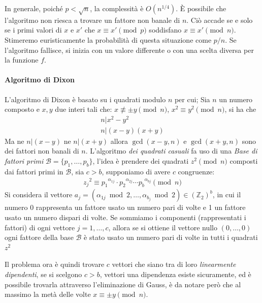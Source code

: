 \vspace{0.2cm} \noindent In generale, poiché $p<\sqrt{n}$, la complessità è $O(n^{1/4})$. È possibile che l'algoritmo non riesca a trovare un fattore non banale di $n$. Ciò accade se e solo se i primi valori di $x$ e $x'$ che $x \equiv x' \pmod p$ soddisfano $x \equiv x'  \pmod n$. Stimeremo euristicamente la probabilità di questa situazione come $p/n$. Se l'algoritmo fallisce, si inizia con un valore differente o con una scelta diversa per la funzione $f$. 


\vspace{0.2cm} \noindent \paragraph{Algoritmo di Dixon}
L'algoritmo di Dixon è basato su i quadrati modulo $n$ per cui; Sia $n$ un numero composto e $x,y$ due interi tali che: $x \not\equiv \pm y \pmod n$, $x^2 \equiv y^2 \pmod n$, si ha che 
\begin{gather*}
    n | x^2 - y^2 \\
    n | (x-y)(x+y) 
\end{gather*}
Ma ne $n | (x-y)$ ne $n| (x+y)$ allora $\gcd(x-y,n)$ e $\gcd(x+y,n)$ sono dei fattori non banali di $n$. L'algoritmo \textit{dei quadrati casuali} fa uso di una \textit{Base di fattori primi} $\mathcal{B} = \{p_1,\dots,p_b\}$, l'idea è prendere dei quadrati $z^2 \pmod n$ composti dai fattori primi in $\mathcal{B}$, sia $c > b$, supponiamo di avere $c$ congruenze:
\begin{align*}
    {z_j}^2 \equiv {p_1}^{\alpha_{1j}} \cdot {p_2}^{\alpha_{2j}} \cdots {p_b}^{\alpha_{bj}} \pmod n
\end{align*}
Si considera il vettore $a_j = (\alpha_{1j} \bmod 2,\dots, \alpha_{b_j} \bmod 2) \in (\mathbb{Z}_2)^{b}$, in cui il numero 0 rappresenta un fattore usato un numero pari di volte e 1 un fattore usato un numero dispari di volte. Se sommiamo i componenti (rappresentati i fattori) di ogni vettore $j=1,\dots,c$, allora se si ottiene il vettore nullo $(0,\dots, 0)$ ogni fattore della base $\mathcal{B}$ è stato usato un numero pari di volte in tutti i quadrati $z^2$

Il problema ora è quindi trovare $c$ vettori che siano tra di loro \textit{linearmente dipendenti}, se si scelgono $c>b$, vettori una dipendenza esiste sicuramente, ed è possibile trovarla attraverso l'eliminazione di Gauss, è da notare però che al massimo la metà delle volte $x \equiv \pm y \pmod n$. 

